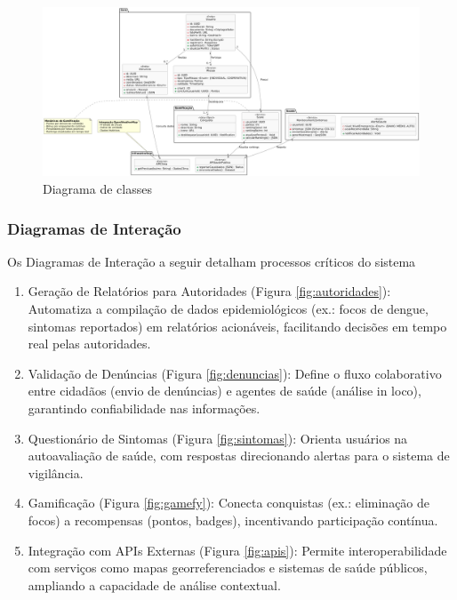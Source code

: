\documentclass[a4paper, 12pt]{article}
\begin{document}
\begin{figure}[H]
    \centering
    \includegraphics[width=1\textwidth]{dist/Diagrama de clases.png}
    \caption{Diagrama de classes}
    \label{fig:classes}
\end{figure}


\subsubsection{Diagramas de Interação}
Os Diagramas de Interação a seguir detalham processos críticos do sistema

\begin{enumerate}
  \item Geração de Relatórios para Autoridades (Figura \ref{fig:autoridades}): Automatiza a compilação de dados epidemiológicos (ex.: focos de dengue, sintomas reportados) em relatórios acionáveis, facilitando decisões em tempo real pelas autoridades.

  \item Validação de Denúncias (Figura \ref{fig:denuncias}): Define o fluxo colaborativo entre cidadãos (envio de denúncias) e agentes de saúde (análise in loco), garantindo confiabilidade nas informações.

  \item Questionário de Sintomas (Figura \ref{fig:sintomas}): Orienta usuários na autoavaliação de saúde, com respostas direcionando alertas para o sistema de vigilância.

  \item Gamificação (Figura \ref{fig:gamefy}): Conecta conquistas (ex.: eliminação de focos) a recompensas (pontos, badges), incentivando participação contínua.

  \item Integração com APIs Externas (Figura \ref{fig:apis}): Permite interoperabilidade com serviços como mapas georreferenciados e sistemas de saúde públicos, ampliando a capacidade de análise contextual.
\end{enumerate}
\end{document}
